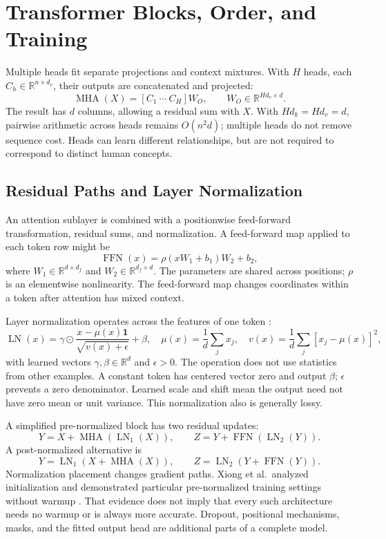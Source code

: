 \section{Transformer Blocks, Order, and Training}

Multiple heads fit separate projections and context mixtures. With $H$ heads, each $C_h\in\mathbb R^{n\times d_v}$, their outputs are concatenated and projected:
\[
\operatorname{MHA}(X)=[C_1\ \cdots\ C_H]W_O,
\qquad W_O\in\mathbb R^{Hd_v\times d}.
\]
The result has $d$ columns, allowing a residual sum with $X$. With $Hd_k=Hd_v=d$, pairwise arithmetic across heads remains $O(n^2d)$; multiple heads do not remove sequence cost. Heads can learn different relationships, but are not required to correspond to distinct human concepts.

\subsection{Residual Paths and Layer Normalization}

An attention sublayer is combined with a positionwise feed-forward transformation, residual sums, and normalization. A feed-forward map applied to each token row might be
\[
\operatorname{FFN}(x)=\rho(xW_1+b_1)W_2+b_2,
\]
where $W_1\in\mathbb R^{d\times d_f}$ and $W_2\in\mathbb R^{d_f\times d}$. The parameters are shared across positions; $\rho$ is an elementwise nonlinearity. The feed-forward map changes coordinates within a token after attention has mixed context.

Layer normalization operates across the features of one token \citep{ba2016layernorm}:
\[
\operatorname{LN}(x)=\gamma\odot
\frac{x-\mu(x)\mathbf1}{\sqrt{v(x)+\epsilon}}+\beta,
\quad\mu(x)=\frac1d\sum_jx_j,
\quad v(x)=\frac1d\sum_j[x_j-\mu(x)]^2,
\]
with learned vectors $\gamma,\beta\in\mathbb R^d$ and $\epsilon>0$. The operation does not use statistics from other examples. A constant token has centered vector zero and output $\beta$; $\epsilon$ prevents a zero denominator. Learned scale and shift mean the output need not have zero mean or unit variance. This normalization also is generally lossy.

A simplified pre-normalized block has two residual updates:
\[
Y=X+\operatorname{MHA}(\operatorname{LN}_1(X)),
\qquad Z=Y+\operatorname{FFN}(\operatorname{LN}_2(Y)).
\]
A post-normalized alternative is
\[
Y=\operatorname{LN}_1(X+\operatorname{MHA}(X)),
\qquad Z=\operatorname{LN}_2(Y+\operatorname{FFN}(Y)).
\]
Normalization placement changes gradient paths. Xiong et al.\ analyzed initialization and demonstrated particular pre-normalized training settings without warmup \citep{xiong2020layernorm}. That evidence does not imply that every such architecture needs no warmup or is always more accurate. Dropout, positional mechanisms, masks, and the fitted output head are additional parts of a complete model.


